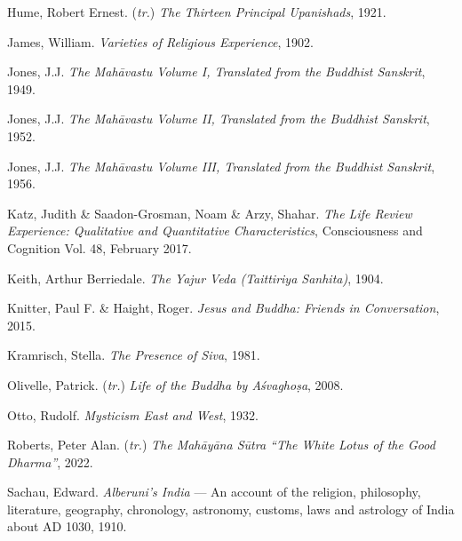 \label{footprints_split_023.html_Humeux201921}
Hume, Robert Ernest. (\emph{tr.}) \emph{The Thirteen Principal
Upanishads}, 1921.

\label{footprints_split_023.html_Jamesux201902}
James, William. \emph{Varieties of Religious Experience}, 1902.

\label{footprints_split_023.html_Jonesux201949}
Jones, J.J. \emph{The Mahāvastu Volume I, Translated from the Buddhist
Sanskrit}, 1949.

\label{footprints_split_023.html_Jonesux201952}
Jones, J.J. \emph{The Mahāvastu Volume II, Translated from the Buddhist
Sanskrit}, 1952.

\label{footprints_split_023.html_Jonesux201956}
Jones, J.J. \emph{The Mahāvastu Volume III, Translated from the Buddhist
Sanskrit}, 1956.

\label{footprints_split_023.html_Katzux20Saadon-Grosmanux202017}
Katz, Judith \& Saadon-Grosman, Noam \& Arzy, Shahar. \emph{The Life
Review Experience: Qualitative and Quantitative Characteristics},
Consciousness and Cognition Vol. 48, February 2017.

\label{footprints_split_023.html_Keithux201904}
Keith, Arthur Berriedale. \emph{The Yajur Veda (Taittiriya Sanhita)},
1904.

\label{footprints_split_023.html_Knitterux202015}
Knitter, Paul F. \& Haight, Roger. \emph{Jesus and Buddha: Friends in
Conversation}, 2015.

\label{footprints_split_023.html_Kramrischux201981}
Kramrisch, Stella. \emph{The Presence of Siva}, 1981.

\label{footprints_split_023.html_Olivelleux202008}
Olivelle, Patrick. (\emph{tr.}) \emph{Life of the Buddha by Aśvaghoṣa},
2008.

\label{footprints_split_023.html_Ottoux201932}
Otto, Rudolf. \emph{Mysticism East and West}, 1932.

\label{footprints_split_023.html_Robertsux202022}
Roberts, Peter Alan. (\emph{tr.}) \emph{The Mahāyāna Sūtra ``The White
Lotus of the Good Dharma''}, 2022.

\label{footprints_split_023.html_Sachauux201910}
Sachau, Edward. \emph{Alberuni's India} --- An account of the religion,
philosophy, literature, geography, chronology, astronomy, customs, laws
and astrology of India about AD 1030, 1910.

